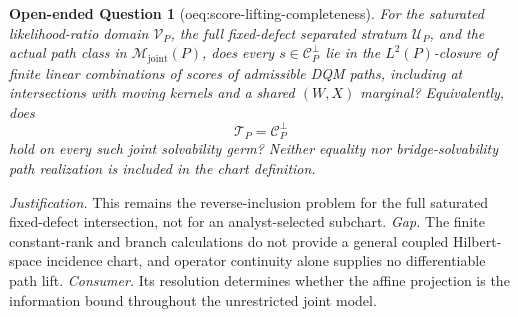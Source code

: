 \documentclass{article}
\newtheorem{openendedquestion}{Open-ended Question}
\begin{document}
\begin{openendedquestion}[oeq:score-lifting-completeness]\label{oeq:score-lifting-completeness}
For the saturated likelihood-ratio domain \(\mathcal V_P\), the full fixed-defect separated stratum \(\mathcal U_P\), and the actual path class in \(\mathcal M_{\mathrm{joint}}(P)\), does every \(s\in\mathcal C_P^\perp\) lie in the \(L^2(P)\)-closure of finite linear combinations of scores of admissible DQM paths, including at intersections with moving kernels and a shared \((W,X)\) marginal? Equivalently, does
\[
\mathcal T_P=\mathcal C_P^\perp
\]
hold on every such joint solvability germ?  Neither equality nor bridge-solvability path realization is included in the chart definition.
\end{openendedquestion}
\par\smallskip\noindent \textit{Justification.} This remains the reverse-inclusion problem for the full saturated fixed-defect intersection, not for an analyst-selected subchart. \textit{Gap.} The finite constant-rank and branch calculations do not provide a general coupled Hilbert-space incidence chart, and operator continuity alone supplies no differentiable path lift. \textit{Consumer.} Its resolution determines whether the affine projection is the information bound throughout the unrestricted joint model.
\end{document}
